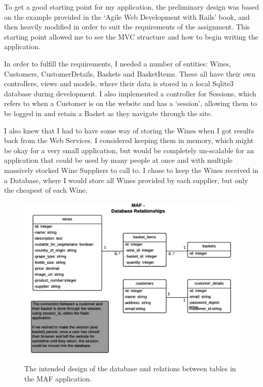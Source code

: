 \documentclass[12pt]{article}
\begin{document}
To get a good starting point for my application, the preliminary design was based on the example provided in the `Agile Web Development with Rails'\cite{railsbook} book, and then heavily modified in order to suit the requirements of the assignment. This starting point allowed me to see the MVC structure and how to begin writing the application.

In order to fulfill the requirements, I needed a number of entities: Wines, Customers, CustomerDetails, Baskets and BasketItems. These all have their own controllers, views and models, where their data is stored in a local Sqlite3 database during development. I also implemented a controller for Sessions, which refers to when a Customer is on the website and has a `session', allowing them to be logged in and retain a Basket as they navigate through the site.

I also knew that I had to have some way of storing the Wines when I got results back from the Web Services. I considered keeping them in memory, which might be okay for a very small application, but would be completely un-scalable for an application that could be used by many people at once and with multiple massively stocked Wine Suppliers to call to. I chose to keep the Wines received in a Database, where I would store all Wines provided by each supplier, but only the cheapest of each Wine.

\begin{figure}[H]
        \centering
                \includegraphics[width=1\textwidth]{assets/MAF_Database_relationships}
                \caption{The intended design of the database and relations between tables in the MAF application.}
                \label{fig: Intended MAF Database relationships.} 
\end{figure}
\end{document}
